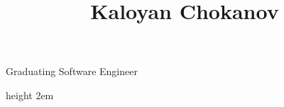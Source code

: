 \documentclass{CVClass}
\begin{document}
\begin{minipage}[t][3cm]{0.62\textwidth}
    \title{Kaloyan Chokanov}{Graduating Software Engineer}
\end{minipage}

\vline height 2em \quad

\begin{minipage}[t][3cm]{0.35\textwidth}
    \vspace{-\baselineskip}
\end{minipage}
\end{document}
